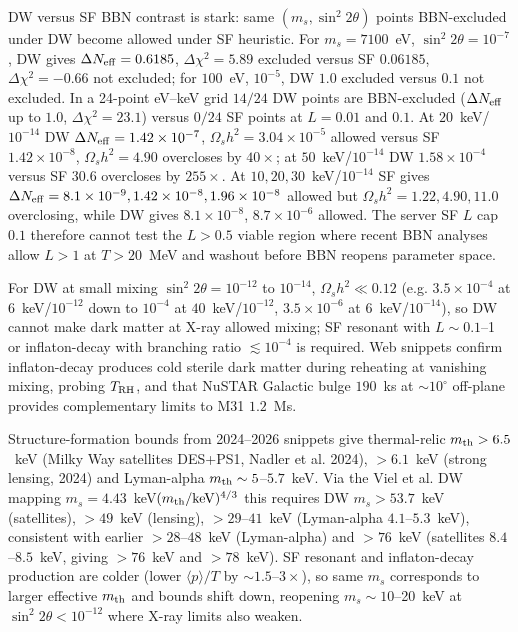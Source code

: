 \documentclass[11pt,a4paper]{article}
\begin{document}
DW versus SF BBN contrast is stark: same $(m_{s},\sin^{2}2\theta)$ points BBN-excluded under DW become allowed under SF heuristic. For $m_{s}=7100$~eV, $\sin^{2}2\theta=10^{-7}$, DW gives $\Delta N_{\rm eff}=0.6185$, $\Delta\chi^{2}=5.89$ excluded versus SF $0.06185$, $\Delta\chi^{2}=-0.66$ not excluded; for $100$~eV, $10^{-5}$, DW $1.0$ excluded versus $0.1$ not excluded. In a 24-point eV--keV grid $14/24$ DW points are BBN-excluded ($\Delta N_{\rm eff}$ up to $1.0$, $\Delta\chi^{2}=23.1$) versus $0/24$ SF points at $L=0.01$ and $0.1$. At $20$~keV/$10^{-14}$ DW $\Delta N_{\rm eff}=1.42\times10^{-7}$, $\Omega_{s}h^{2}=3.04\times10^{-5}$ allowed versus SF $1.42\times10^{-8}$, $\Omega_{s}h^{2}=4.90$ overcloses by $40\times$; at $50$~keV/$10^{-14}$ DW $1.58\times10^{-4}$ versus SF $30.6$ overcloses by $255\times$. At $10,20,30$~keV/$10^{-14}$ SF gives $\Delta N_{\rm eff}=8.1\times10^{-9},1.42\times10^{-8},1.96\times10^{-8}$ allowed but $\Omega_{s}h^{2}=1.22,4.90,11.0$ overclosing, while DW gives $8.1\times10^{-8}$, $8.7\times10^{-6}$ allowed. The server SF $L$ cap $0.1$ therefore cannot test the $L>0.5$ viable region where recent BBN analyses allow $L>1$ at $T>20$~MeV and washout before BBN reopens parameter space.

For DW at small mixing $\sin^{2}2\theta=10^{-12}$ to $10^{-14}$, $\Omega_{s}h^{2}\ll0.12$ (e.g. $3.5\times10^{-4}$ at $6$~keV/$10^{-12}$ down to $10^{-4}$ at $40$~keV/$10^{-12}$, $3.5\times10^{-6}$ at $6$~keV/$10^{-14}$), so DW cannot make dark matter at X-ray allowed mixing; SF resonant with $L\sim0.1$--1 or inflaton-decay with branching ratio $\lesssim10^{-4}$ is required. Web snippets confirm inflaton-decay produces cold sterile dark matter during reheating at vanishing mixing, probing $T_{\rm RH}$, and that NuSTAR Galactic bulge $190$~ks at $\sim10^{\circ}$ off-plane provides complementary limits to M31 $1.2$~Ms.

Structure-formation bounds from 2024--2026 snippets give thermal-relic $m_{\rm th}>6.5$~keV (Milky Way satellites DES+PS1, Nadler et al. 2024), $>6.1$~keV (strong lensing, 2024) and Lyman-alpha $m_{\rm th}\sim5$--$5.7$~keV. Via the Viel et al. DW mapping $m_{s}=4.43$~keV$(m_{\rm th}/{\rm keV})^{4/3}$ this requires DW $m_{s}>53.7$~keV (satellites), $>49$~keV (lensing), $>29$--$41$~keV (Lyman-alpha $4.1$--$5.3$~keV), consistent with earlier $>28$--$48$~keV (Lyman-alpha) and $>76$~keV (satellites $8.4$--$8.5$~keV, giving $>76$~keV and $>78$~keV). SF resonant and inflaton-decay production are colder (lower $\langle p\rangle/T$ by $\sim1.5$--$3\times$), so same $m_{s}$ corresponds to larger effective $m_{\rm th}$ and bounds shift down, reopening $m_{s}\sim10$--20~keV at $\sin^{2}2\theta<10^{-12}$ where X-ray limits also weaken.
\end{document}
